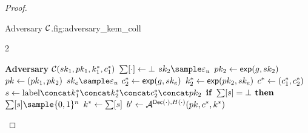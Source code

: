 \documentclass{article}
\begin{document}
\begin{proof}
\begin{itemize}
                                                                                \begin{gamefigure}{Adversary $\mathcal{C}$.}{fig:adversary_kem_coll}
                                                                                    \begin{games}{2}
                                                                                        \begin{gameenv}{\textbf{Adversary} $\mathcal{C}(sk_1, pk_1, k_1^*, c_1^*)$}
                                                                                            \State $\sum[\cdot] \leftarrow \bot$
                                                                                            \State $\sk_2 \sample \exponent$
                                                                                            \State $pk_2 \leftarrow \textsf{exp}(g, sk_2)$
                                                                                            \State $pk \leftarrow (pk_1, pk_2)$
                                                                                            \State $\sk_e \sample \exponent$
                                                                                            \State $c^*_2 \leftarrow \textsf{exp}(g, sk_e)$
                                                                                            \State $k^*_2 \leftarrow \textsf{exp}(pk_2, sk_e)$
                                                                                            \State $c^* \leftarrow (c^*_1, c^*_2)$
                                                                                            \State $s \assign \text{label} \concat k^*_1 \concat k^*_2 \concat c^*_2 \concat \pk_2$
                                                                                            \State $\textbf{if } \sum[s] = \bot \textbf{ then}$
                                                                                                \State \quad $\ROMtable[s] \sample \bits^{n}$
                                                                                                \State $k^* \leftarrow \sum[s]$
                                                                                                \State $b' \leftarrow \mathcal{A}^{\textsf{Dec}(\cdot), H(\cdot)}(pk, c^*, k^*)$
                                                                                            \end{gameenv}
                                                                                            \gamebreak
                                                                                            \begin{gameenv}{\oracledec}

\end{gameenv}
\end{games}
\end{gamefigure}
\end{itemize}
\end{proof}
\end{document}
